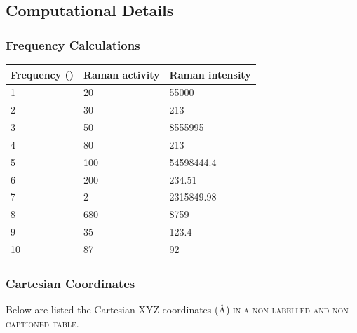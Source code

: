 \documentclass[main_brownies.tex]{subfiles}
\begin{document}
\FloatBarrier %

\subsection*{Computational Details}
\subsubsection*{Frequency Calculations}

\renewcommand{\arraystretch}{1.5} %

\begin{center}
	\footnotesize %
	\captionsetup{type=tableSI}
	\caption{Caption of a long table that can extend over multiple pages. For example for calculated frequencies.}
	\begin{longtable}{|l|l|l|}
		\hline
		Frequency (\cm{}) & Raman activity & Raman intensity \\\hline\hline
		1 & 20 & 55000\\\hline
		2 & 30 & 213\\\hline
		3 & 50 & 8555995\\\hline
		4 & 80 & 213\\\hline
		5 & 100 & 54598444.4\\\hline
		6 & 200 & 234.51\\\hline
		7 & 2 & 2315849.98\\\hline
		8 & 680 & 8759\\\hline
		9 & 35 & 123.4\\\hline
		10 & 87 & 92\\\hline
	\end{longtable}
\end{center}

\renewcommand{\arraystretch}{1.0} %

\clearpage %

\subsubsection*{Cartesian Coordinates}
Below are listed the Cartesian XYZ coordinates (\AA) \textsc{in a non-labelled and non-captioned table}.

\medskip
\end{document}
